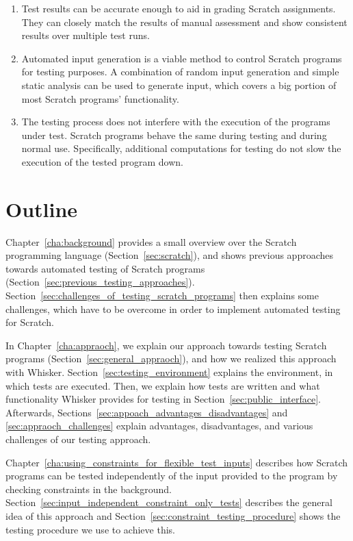 \begin{enumerate}[(1)]
    \item Test results can be accurate enough to aid in grading Scratch assignments.
        They can closely match the results of manual assessment and show consistent results over multiple test runs.
    \item Automated input generation is a viable method to control Scratch programs for testing purposes.
        A combination of random input generation and simple static analysis can be used to generate input, which covers a big portion of most Scratch programs' functionality.
    \item The testing process does not interfere with the execution of the programs under test.
        Scratch programs behave the same during testing and during normal use.
        Specifically, additional computations for testing do not slow the execution of the tested program down.
\end{enumerate}

\section{Outline}

Chapter~\ref{cha:background} provides a small overview over the Scratch programming language (Section~\ref{sec:scratch}),
and shows previous approaches towards automated testing of Scratch programs (Section~\ref{sec:previous_testing_approaches}).
Section~\ref{sec:challenges_of_testing_scratch_programs} then explains some challenges,
which have to be overcome in order to implement automated testing for Scratch.
\parspace

In Chapter~\ref{cha:appraoch}, we explain our approach towards testing Scratch programs (Section~\ref{sec:general_appraoch}),
and how we realized this approach with Whisker.
Section~\ref{sec:testing_environment} explains the environment, in which tests are executed.
Then, we explain how tests are written and what functionality Whisker provides for testing in Section~\ref{sec:public_interface}.
Afterwards, Sections~\ref{sec:appoach_advantages_disadvantages} and \ref{sec:appraoch_challenges} explain advantages, disadvantages,
and various challenges of our testing approach.
\parspace

Chapter~\ref{cha:using_constraints_for_flexible_test_inputs} describes how Scratch programs can be tested
independently of the input provided to the program by checking constraints in the background.
Section~\ref{sec:input_independent_constraint_only_tests} describes the general idea of this approach and
Section~\ref{sec:constraint_testing_procedure} shows the testing procedure we use to achieve this.
\parspace


